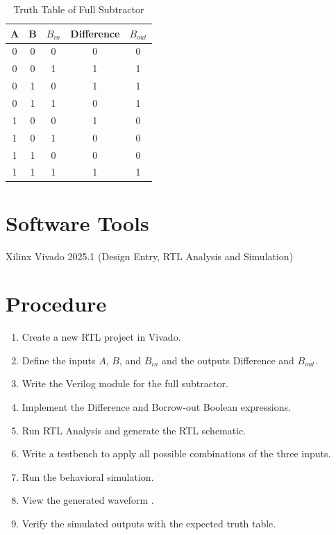 \documentclass[12pt,a4paper]{report}
\begin{document}
\begin{table}[H]
    \centering
    \caption{Truth Table of Full Subtractor}
    \label{tab:full_subtractor}
    \begin{tabular}{|c|c|c|c|c|}
    \hline
    \textbf{A} & \textbf{B} & \textbf{$B_{in}$} &
    \textbf{Difference} & \textbf{$B_{out}$} \\
    \hline
    0 & 0 & 0 & 0 & 0 \\
    \hline
    0 & 0 & 1 & 1 & 1 \\
    \hline
    0 & 1 & 0 & 1 & 1 \\
    \hline
    0 & 1 & 1 & 0 & 1 \\
    \hline
    1 & 0 & 0 & 1 & 0 \\
    \hline
    1 & 0 & 1 & 0 & 0 \\
    \hline
    1 & 1 & 0 & 0 & 0 \\
    \hline
    1 & 1 & 1 & 1 & 1 \\
    \hline
    \end{tabular}
\end{table}

\section{Software Tools}

Xilinx Vivado 2025.1 (Design Entry, RTL Analysis and Simulation)

\section{Procedure}

\begin{enumerate}
    \item Create a new RTL project in Vivado.
    \item Define the inputs $A$, $B$, and $B_{in}$ and the outputs Difference and $B_{out}$.
    \item Write the Verilog module for the full subtractor.
    \item Implement the Difference and Borrow-out Boolean expressions.
    \item Run RTL Analysis and generate the RTL schematic.
    \item Write a testbench to apply all possible combinations of the three inputs.
    \item Run the behavioral simulation.
    \item View the generated waveform .
    \item Verify the simulated outputs with the expected truth table.
\end{enumerate}
\end{document}
